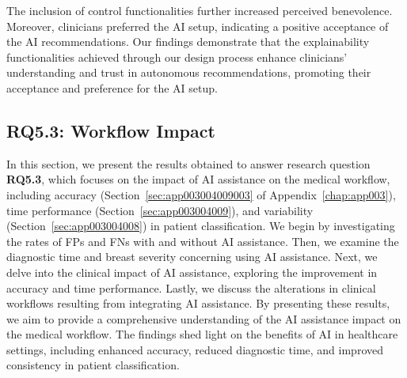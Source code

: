 The inclusion of control functionalities further increased perceived benevolence.
Moreover, clinicians preferred the \ac{AI} setup, indicating a positive acceptance of the \ac{AI} recommendations.
Our findings demonstrate that the explainability functionalities achieved through our design process enhance clinicians' understanding and trust in autonomous recommendations, promoting their acceptance and preference for the \ac{AI} setup.

\subsection{RQ5.3: Workflow Impact}
\label{sec:chap005006003}

In this section, we present the results obtained to answer research question {\bf RQ5.3}, which focuses on the impact of \ac{AI} assistance on the medical workflow, including accuracy (Section~\ref{sec:app003004009003} of Appendix~\ref{chap:app003}), time performance (Section~\ref{sec:app003004009}), and variability (Section~\ref{sec:app003004008}) in patient classification.
We begin by investigating the rates of \acp{FP} and \acp{FN} with and without \ac{AI} assistance.
Then, we examine the diagnostic time and breast severity concerning using \ac{AI} assistance.
Next, we delve into the clinical impact of \ac{AI} assistance, exploring the improvement in accuracy and time performance.
Lastly, we discuss the alterations in clinical workflows resulting from integrating \ac{AI} assistance.
By presenting these results, we aim to provide a comprehensive understanding of the \ac{AI} assistance impact on the medical workflow.
The findings shed light on the benefits of \ac{AI} in healthcare settings, including enhanced accuracy, reduced diagnostic time, and improved consistency in patient classification.

